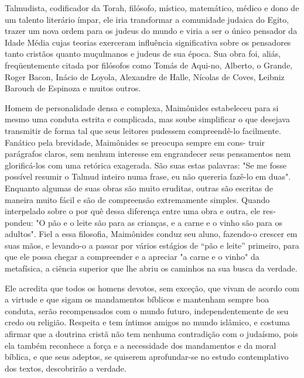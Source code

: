 Talmudista, codificador da Torah, filósofo, místico, matemático, mé­dico
e dono de um talento literário ímpar, ele iria transformar a comunidade
judaica do Egito, trazer um nova ordem para os judeus do mundo e viria a
ser o único pensador da Idade Média cujas teorias exerceram influência
significati­va sobre os pensadores tanto cristãos quanto muçulmanos e
judeus de sua épo­ca. Sua obra foi, aliás, freqüentemente citada por
filósofos como Tomás de Aqui-no, Alberto, o Grande, Roger Bacon, Inácio
de Loyola, Alexandre de Halle, Ní­colas de Coves, Leibniz Barouch de
Espinoza e muitos outros.

Homem de personalidade densa e complexa, Maimônides estabele­ceu para si
mesmo uma conduta estrita e complicada, mas soube simplificar o que
desejava transmitir de forma tal que seus leitores pudessem
compreendê-lo facilmente. Fanático pela brevidade, Maimônides se
preocupa sempre em cons-
truir parágrafos claros, sem nenhum interesse em engrandecer seus
pensamen­tos nem glorificá-los com uma retórica exagerada. São suas
estas palavras: "Se me fosse possível resumir o Talmud inteiro numa
frase, eu não quereria fazê-lo em duas". Enquanto algumas de suas obras
são muito eruditas, outras são escri­tas de maneira muito fácil e são de
compreensão extremamente simples. Quan­do interpelado sobre o por quê
dessa diferença entre uma obra e outra, ele res­pondeu: "O pão e o leite
são para as crianças, e a carne e o vinho são para os adultos". Fiel a
essa filosofia, Maimônides conduz seu aluno, fazendo-o crescer em suas
mãos, e levando-o a passar por vários estágios de ``pão e leite''
primeiro, para que ele possa chegar a compreender e a apreciar "a carne
e o vinho" da metafísica, a ciência superior que lhe abriu os caminhos
na sua busca da verdade.

Ele acredita que todos os homens devotos, sem exceção, que vivam de
acordo com a virtude e que sigam os mandamentos bíblicos e mantenham
sempre boa conduta, serão recompensados com o mundo futuro,
independen­temente de seu credo ou religião. Respeita e tem íntimos
amigos no mundo islâmico, e costuma afirmar que a doutrina cristã não
tem nenhuma contradi­ção com o judaísmo, pois ela também reconhece a
força e a necessidade dos mandamentos e da moral bíblica, e que seus
adeptos, se quiserem aprofundar-se no estudo contemplativo dos textos,
descobrirão a verdade.

